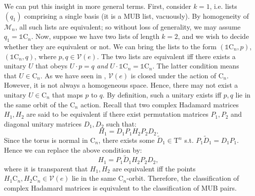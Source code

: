 \documentclass[referee,sn-mathphys-num]{sn-jnl}%
\theoremstyle{thmstyleone}%
\theoremstyle{thmstyletwo}%
\theoremstyle{remark}
\theoremstyle{thmstylethree}%
\begin{document}
We can put this insight in more general terms. First, consider $k=1$, i.e. lists $ \left( q_1 \right) $ comprising a single basis (it is a MUB list, vacuously). By homogeneity of $\mathcal{M}_n$, all such lists are equivalent; so without loss of generality, we may assume $q_1 = \mathds{1} \mathrm{C}_n$. Now, suppose we have two lists of length $k=2$, and we wish to decide whether they are equivalent or not. We can bring the lists to the form $ \left( \mathds{1} \mathrm{C}_n, p \right) $, $ \left( \mathds{1} \mathrm{C}_n, q \right) $, where $p, q \in \mathcal{V} \left( e \right)$.
The two lists are equivalent iff there exists a unitary $U$ that obeys $ U \cdot p = q $ \textit{and} $ U \cdot \mathds{1} \mathrm{C}_n = \mathds{1} \mathrm{C}_n $. The latter condition means that $U \in \mathrm{C}_n$. As we have seen in , $\mathcal{V} \left( e \right)$ is closed under the action of $\mathrm{C}_n$. However, it is not always a homogeneous space. Hence, there may not exist a unitary $U \in \mathrm{C}_n$ that maps $p$ to $q$. By definition, such a unitary exists iff $p, q$ lie in the same orbit of the $\mathrm{C}_n$ action. 
Recall that two complex Hadamard matrices $H_1, H_2$ are said to be equivalent if there exist permutation matrices $ P_1, P_2 $ and diagonal unitary matrices $ D_1, D_2 $ such that:
\begin{equation}
	H_1 = D_1 P_1 H_2 P_2 D_2 .
\end{equation}
Since the torus is normal in $ \mathrm{C}_n $, there exists some $ \tilde{D}_1 \in \mathrm{T}^n $ s.t. $ P_1 \tilde{D}_1 = D_1 P_1 $. Hence we can replace the above condition by:
\begin{equation}
	H_1 = P_1 \tilde{D}_1 H_2 P_2 D_2 ,
\end{equation}
where it is transparent that $H_1, H_2$ are equivalent iff the points $ H_1 \mathrm{C}_n, H_2 \mathrm{C}_n \in \mathcal{V} \left( e \right) $ lie in the same $\mathrm{C}_n$-orbit. Therefore, the classification of complex Hadamard matrices is equivalent to the classification of MUB pairs.
\end{document}
